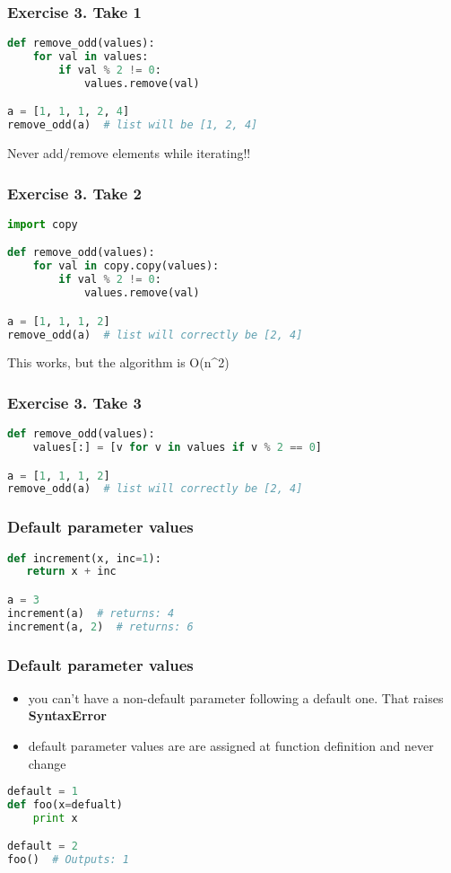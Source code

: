 \documentclass{beamer}
\begin{document}
\begin{frame}[fragile]
\frametitle{Exercise 3. Take 1}

\begin{lstlisting}[language=python]
def remove_odd(values):
    for val in values:
        if val % 2 != 0:
            values.remove(val)

a = [1, 1, 1, 2, 4]
remove_odd(a)  # list will be [1, 2, 4]
\end{lstlisting}
\vspace{5 mm}
Never add/remove elements while iterating!!
\end{frame}

\begin{frame}[fragile]
\frametitle{Exercise 3. Take 2}
\begin{lstlisting}[language=python]
import copy

def remove_odd(values):
    for val in copy.copy(values):
        if val % 2 != 0:
            values.remove(val)

a = [1, 1, 1, 2]
remove_odd(a)  # list will correctly be [2, 4]
\end{lstlisting}
\vspace{5 mm}
This works, but the algorithm is O(n^2)
\end{frame}


\begin{frame}[fragile]
\frametitle{Exercise 3. Take 3}
\begin{lstlisting}[language=python]
def remove_odd(values):
    values[:] = [v for v in values if v % 2 == 0]

a = [1, 1, 1, 2]
remove_odd(a)  # list will correctly be [2, 4]
\end{lstlisting}
\end{frame}


\begin{frame}[fragile]
\frametitle{Default parameter values}

\begin{lstlisting}[language=python]
def increment(x, inc=1):
   return x + inc

a = 3
increment(a)  # returns: 4
increment(a, 2)  # returns: 6
\end{lstlisting}
\end{frame}

\begin{frame}[fragile]
\frametitle{Default parameter values}

\begin{itemize}
  \item you can't have a non-default parameter following a default one. That raises {\bf SyntaxError}
  \item default parameter values are are assigned at function definition and never change
\end{itemize}

\begin{lstlisting}[language=python]
default = 1
def foo(x=defualt)
    print x

default = 2
foo()  # Outputs: 1
\end{lstlisting}
\end{frame}
\end{document}
